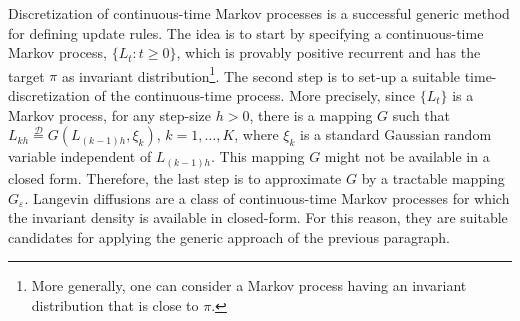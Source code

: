 \documentclass[a4paper,bej,preprint,reqno]{imsart}
\begin{document}
Discretization of continuous-time Markov processes is a successful generic method for defining update rules. The idea is to start by specifying a continuous-time Markov process,
$\{L_t:t\ge 0\}$, which is provably positive recurrent and has the target $\pi$ as  invariant distribution\footnote{More generally, one can consider a Markov process having an invariant distribution that is close to $\pi$. }. The second step is to set-up a suitable time-discretization of the continuous-time process.  More precisely, since $\{L_t\}$ is a Markov process, for any step-size $h>0$, there is a mapping $G$ such that $L_{kh} \stackrel{\mathscr D}{=}
G(L_{(k-1)h},\xi_k)$, $k=1,\ldots,K$,  where
$\xi_k$ is a standard Gaussian random variable independent of $L_{(k-1)h}$. This mapping $G$ might not be available in a closed form. Therefore, the last step is to approximate $G$ by a tractable mapping $G_\varepsilon$.
Langevin diffusions are a class of continuous-time Markov processes for which the invariant density is available in closed-form. For this reason, they are suitable candidates for applying the generic approach of the previous paragraph.
\end{document}
